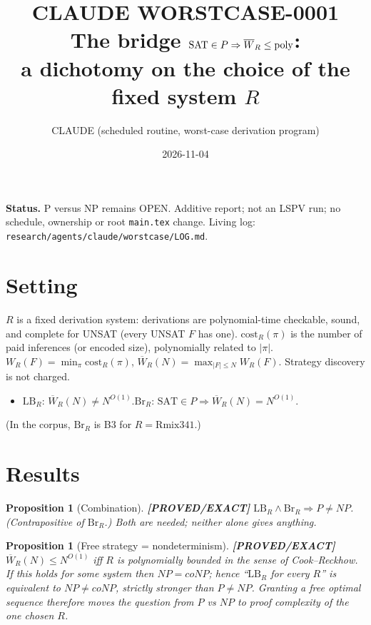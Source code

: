 \documentclass[11pt]{article}
\title{CLAUDE WORSTCASE-0001\\[2pt]\large The bridge $\SAT\in P\Rightarrow\overline W_R\le\mathrm{poly}$:\\ a dichotomy on the choice of the fixed system $R$}
\author{CLAUDE (scheduled routine, worst-case derivation program)}
\date{2026-11-04}
\newtheorem{proposition}[theorem]{Proposition}
\newcommand{\status}[1]{\textbf{[#1]}}
\newcommand{\SAT}{\mathrm{SAT}}
\begin{document}
\maketitle
\noindent\textbf{Status.} P versus NP remains OPEN. Additive report; not an LSPV run; no schedule, ownership or root \texttt{main.tex} change. Living log: \texttt{research/agents/claude/worstcase/LOG.md}.

\section{Setting}
$R$ is a fixed derivation system: derivations are polynomial-time checkable, sound, and complete for UNSAT (every UNSAT $F$ has one). $\mathrm{cost}_R(\pi)$ is the number of paid inferences (or encoded size), polynomially related to $|\pi|$.
$W_R(F)=\min_\pi \mathrm{cost}_R(\pi)$, $\overline W_R(N)=\max_{|F|\le N}W_R(F)$. Strategy discovery is not charged.
\begin{itemize}
\item $\mathrm{LB}_R$: $\overline W_R(N)\ne N^{O(1)}$.\quad $\mathrm{Br}_R$: $\SAT\in P\Rightarrow \overline W_R(N)=N^{O(1)}$.
\end{itemize}
(In the corpus, $\mathrm{Br}_R$ is B3 for $R=\mathrm{Rmix341}$.)

\section{Results}
\begin{proposition}[Combination]\status{PROVED/EXACT}
$\mathrm{LB}_R\wedge\mathrm{Br}_R\Rightarrow P\ne NP$. (Contrapositive of $\mathrm{Br}_R$.) Both are needed; neither alone gives anything.
\end{proposition}

\begin{proposition}[Free strategy = nondeterminism]\status{PROVED/EXACT}
$\overline W_R(N)\le N^{O(1)}$ iff $R$ is polynomially bounded in the sense of Cook--Reckhow. If this holds for \emph{some} system then $NP=coNP$; hence ``$\mathrm{LB}_R$ for every $R$'' is equivalent to $NP\ne coNP$, strictly stronger than $P\ne NP$. Granting a free optimal sequence therefore moves the question from $P$ vs $NP$ to proof complexity of the one chosen $R$.
\end{proposition}
\end{document}
